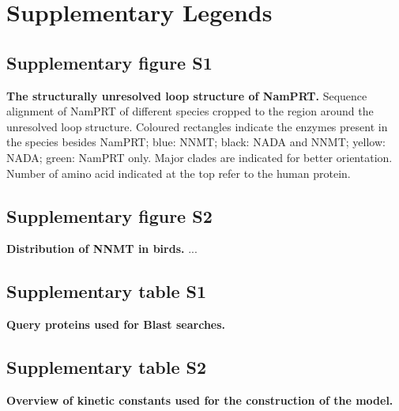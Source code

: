 
\section{Supplementary Legends}

\subsection{Supplementary figure S1}

\textbf{The structurally unresolved loop structure of NamPRT.} Sequence alignment of NamPRT of different species cropped to the region around the unresolved loop structure. Coloured rectangles indicate the enzymes present in the species besides NamPRT; blue: NNMT; black: NADA and NNMT; yellow: NADA; green: NamPRT only. Major clades are indicated for better orientation. Number of amino acid indicated at the top refer to the human protein.


\subsection{Supplementary figure S2}

\textbf{Distribution of NNMT in birds.} ...


\subsection{Supplementary table S1}

\textbf{Query proteins used for Blast searches.}


\subsection{Supplementary table S2}

\textbf{Overview of kinetic constants used for the construction of the model.}
